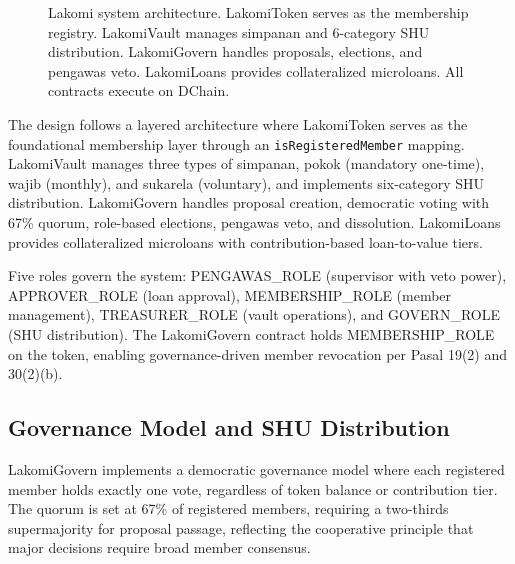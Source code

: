 \documentclass[conference]{IEEEtran}
\begin{document}
\begin{figure}[htbp]
\caption{Lakomi system architecture. LakomiToken serves as the membership registry. LakomiVault manages simpanan and 6-category SHU distribution. LakomiGovern handles proposals, elections, and pengawas veto. LakomiLoans provides collateralized microloans. All contracts execute on DChain.}
\label{fig:architecture}
\end{figure}

The design follows a layered architecture where LakomiToken serves as the foundational membership layer through an \texttt{isRegisteredMember} mapping. LakomiVault manages three types of simpanan, pokok (mandatory one-time), wajib (monthly), and sukarela (voluntary), and implements six-category SHU distribution. LakomiGovern handles proposal creation, democratic voting with 67\% quorum, role-based elections, pengawas veto, and dissolution. LakomiLoans provides collateralized microloans with contribution-based loan-to-value tiers.

Five roles govern the system: PENGAWAS\_ROLE (supervisor with veto power), APPROVER\_ROLE (loan approval), MEMBERSHIP\_ROLE (member management), TREASURER\_ROLE (vault operations), and GOVERN\_ROLE (SHU distribution). The LakomiGovern contract holds MEMBERSHIP\_ROLE on the token, enabling governance-driven member revocation per Pasal 19(2) and 30(2)(b).

\subsection{Governance Model and SHU Distribution}

LakomiGovern implements a democratic governance model where each registered member holds exactly one vote, regardless of token balance or contribution tier. The quorum is set at 67\% of registered members, requiring a two-thirds supermajority for proposal passage, reflecting the cooperative principle that major decisions require broad member consensus.
\end{document}
